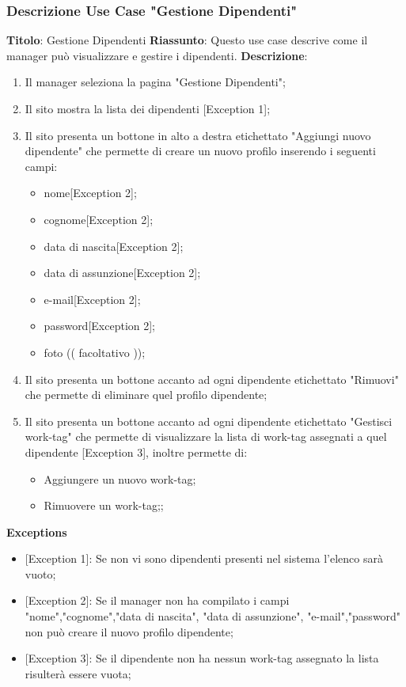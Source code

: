 \documentclass{report}
\begin{document}
\subsubsection*{Descrizione Use Case "Gestione Dipendenti"}
\textbf{Titolo}: Gestione Dipendenti \newline
\textbf{Riassunto}: Questo use case descrive come il manager può visualizzare e gestire i dipendenti. \newline
\textbf{Descrizione}:
\begin{enumerate}
	\item Il manager seleziona la pagina "Gestione Dipendenti";
	\item Il sito mostra la lista dei dipendenti [Exception 1];
	\item Il sito presenta un bottone in alto a destra etichettato "Aggiungi nuovo dipendente" che permette di creare un nuovo profilo inserendo i seguenti campi:
	\begin{itemize}
		\item nome[Exception 2];
		\item cognome[Exception 2]; 
		\item data di nascita[Exception 2];
		\item data di assunzione[Exception 2];
		\item e-mail[Exception 2];
		\item password[Exception 2];
		\item foto (( facoltativo ));
	\end{itemize}
	\item Il sito presenta un bottone accanto ad ogni dipendente etichettato "Rimuovi" che permette di eliminare quel profilo dipendente;
	\item Il sito presenta un bottone accanto ad ogni dipendente etichettato "Gestisci work-tag" che permette di visualizzare la lista di work-tag assegnati a quel dipendente [Exception 3], inoltre permette di:
	\begin{itemize}
		\item Aggiungere un nuovo work-tag;
		\item Rimuovere un work-tag;;
	\end{itemize}
	
\end{enumerate}
\textbf{Exceptions}
\begin{itemize}
	\item {[Exception 1]}: Se non vi sono dipendenti presenti nel sistema l'elenco sarà vuoto;
	\item {[Exception 2]}: Se il manager non ha compilato i campi "nome","cognome","data di nascita", "data di assunzione", "e-mail","password" non può creare il nuovo profilo dipendente;
	\item {[Exception 3]}: Se il dipendente non ha nessun work-tag assegnato la lista risulterà essere vuota;
\end{itemize}
\end{document}
